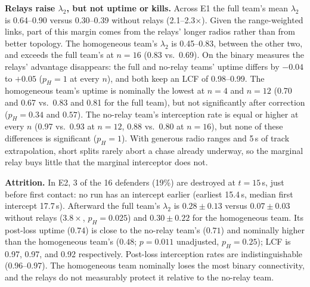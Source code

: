 \documentclass[10pt,twocolumn]{article}
\begin{document}
\textbf{Relays raise $\lambda_2$, but not uptime or kills.} Across E1
the full team's mean $\lambda_2$ is 0.64--0.90 versus 0.30--0.39 without
relays (2.1--2.3$\times$). Given the range-weighted links, part of this
margin comes from the relays' longer radios rather than from better
topology. The homogeneous team's $\lambda_2$ is 0.45--0.83, between the
other two, and exceeds the full team's at $n{=}16$ (0.83 vs.\ 0.69). On
the binary measures the relays' advantage disappears: the full and no-relay
teams' uptime differs by $-0.04$ to $+0.05$ ($p_H=1$ at every $n$), and
both keep an LCF of 0.98--0.99. The homogeneous team's uptime is nominally
the lowest at $n{=}4$ and $n{=}12$ (0.70 and 0.67 vs.\ 0.83 and 0.81 for
the full team), but not significantly after correction ($p_H=0.34$ and
$0.57$). The no-relay team's interception rate is equal or higher at every
$n$ (0.97 vs.\ 0.93 at $n{=}12$, 0.88 vs.\ 0.80 at $n{=}16$), but none of
these differences is significant ($p_H=1$). With generous radio ranges and
5\,s of track extrapolation, short splits rarely abort a chase already
underway, so the marginal relay buys little that the marginal interceptor
does not.

\textbf{Attrition.} In E2, 3 of the 16 defenders (19\%) are destroyed at
$t{=}15$\,s, just before first contact: no run has an intercept earlier
(earliest 15.4\,s, median first intercept 17.7\,s). Afterward the full
team's $\lambda_2$ is $0.28\pm0.13$ versus $0.07\pm0.03$ without relays
($3.8\times$, $p_H=0.025$) and $0.30\pm0.22$ for the homogeneous team. Its
post-loss uptime ($0.74$) is close to the no-relay team's ($0.71$) and
nominally higher than the homogeneous team's ($0.48$; $p=0.011$
unadjusted, $p_H=0.25$); LCF is 0.97, 0.97, and 0.92 respectively.
Post-loss interception rates are indistinguishable (0.96--0.97). The
homogeneous team nominally loses the most binary connectivity, and the
relays do not measurably protect it relative to the no-relay team.
\end{document}
